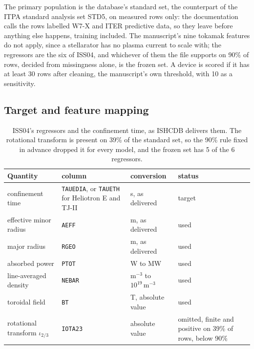 \documentclass[12pt,letterpaper]{article}
\newcommand{\iotatwothirds}{\iota_{2/3}}
\begin{document}
The primary population is the database's standard set, the counterpart of the
ITPA standard analysis set STD5, on measured rows only: the documentation calls
the rows labelled W7-X and ITER predictive data, so they leave before anything
else happens, training included. The manuscript's nine tokamak features do not
apply, since a stellarator has no plasma current to scale with; the regressors
are the six of ISS04, and whichever of them the file supports on
90\% of rows, decided from missingness alone, is the frozen
set. A device is scored if it has at least 30 rows after
cleaning, the manuscript's own threshold, with 10
as a sensitivity.

\subsection{Target and feature mapping}

\begin{table}[htbp]
\centering\small
\caption{ISS04's regressors and the confinement time, as ISHCDB delivers them.
The rotational transform is present on 39\% of the
standard set, so the 90\% rule fixed in advance dropped it
for every model, and the frozen set has 5 of the
6 regressors.}
\label{tab:ishcdb-mapping}
\begin{tabular}{p{3.4cm}p{3.6cm}p{3.0cm}p{3.6cm}}
\toprule
Quantity & column & conversion & status \\
\midrule
confinement time & \texttt{TAUEDIA}, or \texttt{TAUETH} for Heliotron E and TJ-II & s, as delivered & target \\
effective minor radius & \texttt{AEFF} & m, as delivered & used \\
major radius & \texttt{RGEO} & m, as delivered & used \\
absorbed power & \texttt{PTOT} & W to MW & used \\
line-averaged density & \texttt{NEBAR} & $\mathrm{m}^{-3}$ to $10^{19}\,\mathrm{m}^{-3}$ & used \\
toroidal field & \texttt{BT} & T, absolute value & used \\
rotational transform $\iotatwothirds$ & \texttt{IOTA23} & absolute value & omitted, finite and positive on 39\% of rows, below 90\% \\
\bottomrule
\end{tabular}
\par\smallskip{}
\end{table}
\end{document}
